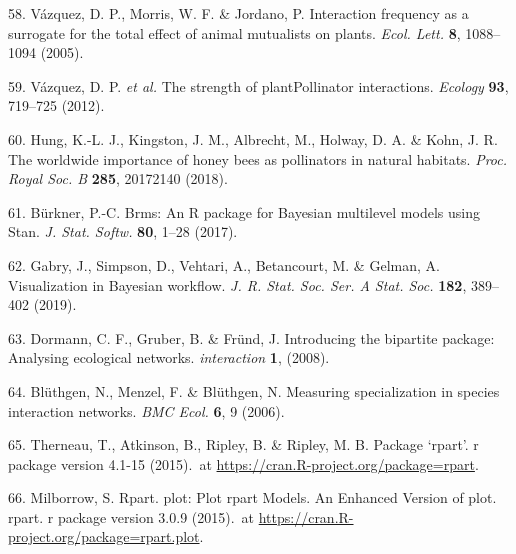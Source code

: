 \documentclass[12pt,a4paper,]{article}
\begin{document}
\hypertarget{ref-vazquez2005}{}
58. Vázquez, D. P., Morris, W. F. \& Jordano, P. Interaction frequency
as a surrogate for the total effect of animal mutualists on plants.
\emph{Ecol. Lett.} \textbf{8}, 1088--1094 (2005).

\hypertarget{ref-vazquez2012}{}
59. Vázquez, D. P. \emph{et al.} The strength of plantPollinator
interactions. \emph{Ecology} \textbf{93}, 719--725 (2012).

\hypertarget{ref-hung2018}{}
60. Hung, K.-L. J., Kingston, J. M., Albrecht, M., Holway, D. A. \&
Kohn, J. R. The worldwide importance of honey bees as pollinators in
natural habitats. \emph{Proc. Royal Soc. B} \textbf{285}, 20172140
(2018).

\hypertarget{ref-burkner2017}{}
61. Bürkner, P.-C. Brms: An R package for Bayesian multilevel models
using Stan. \emph{J. Stat. Softw.} \textbf{80}, 1--28 (2017).

\hypertarget{ref-gabry2019}{}
62. Gabry, J., Simpson, D., Vehtari, A., Betancourt, M. \& Gelman, A.
Visualization in Bayesian workflow. \emph{J. R. Stat. Soc. Ser. A Stat.
Soc.} \textbf{182}, 389--402 (2019).

\hypertarget{ref-dormann2008}{}
63. Dormann, C. F., Gruber, B. \& Fründ, J. Introducing the bipartite
package: Analysing ecological networks. \emph{interaction} \textbf{1},
(2008).

\hypertarget{ref-bluthgen2006}{}
64. Blüthgen, N., Menzel, F. \& Blüthgen, N. Measuring specialization in
species interaction networks. \emph{BMC Ecol.} \textbf{6}, 9 (2006).

\hypertarget{ref-therneau2015}{}
65. Therneau, T., Atkinson, B., Ripley, B. \& Ripley, M. B. Package
`rpart'. r package version 4.1-15 (2015).~at
\href{https://CRAN.R-project.org/package=rpart}{https://cran.R-project.org/package=rpart}.

\hypertarget{ref-milborrow2015}{}
66. Milborrow, S. Rpart. plot: Plot rpart Models. An Enhanced Version of
plot. rpart. r package version 3.0.9 (2015).~at
\href{https://CRAN.R-project.org/package=rpart.plot}{https://cran.R-project.org/package=rpart.plot}.
\end{document}
